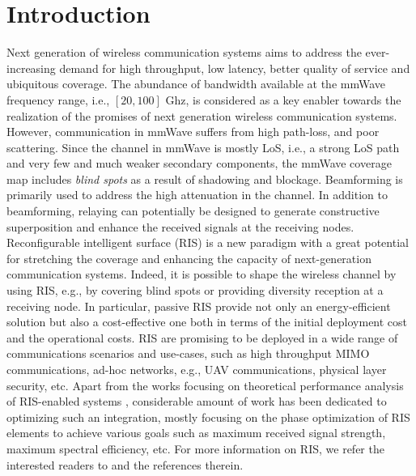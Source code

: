 \section{Introduction}


Next generation of wireless communication systems aims to address the ever-increasing demand for high throughput, low latency, better quality of service and ubiquitous coverage. The abundance of bandwidth available at the mmWave frequency range, i.e., $[20, 100]$ Ghz, is considered as a key enabler towards the realization of the promises of next generation wireless communication systems. However, communication in mmWave suffers from high path-loss, and poor scattering. Since the channel in mmWave is mostly LoS, i.e., a strong LoS path and very few and much weaker secondary components, the mmWave coverage map includes \emph{blind spots} as a result of shadowing and blockage. Beamforming is primarily used to address the high attenuation in the channel. In addition to beamforming, relaying can potentially be designed to generate constructive superposition and enhance the received signals at the receiving nodes. 
Reconfigurable intelligent surface (RIS)\cite{Huang19}\cite{Liaskos18}\cite{Basar19} is a new paradigm with a great potential for stretching the coverage and enhancing the capacity of next-generation communication systems. Indeed, it is possible to shape the wireless channel by using RIS, e.g., by covering blind spots or providing diversity reception at a receiving node. In particular, passive RIS provide not only an energy-efficient solution but also a cost-effective one both in terms of the initial deployment cost and the operational costs. RIS are promising to be deployed in a wide range of communications scenarios and use-cases, such as high throughput MIMO communications\cite{Huang20}\cite{Nadeem20}, ad-hoc networks, e.g., UAV communications\cite{Li20}, physical layer security\cite{Maka20}, etc. %
Apart from the works focusing on theoretical performance analysis of RIS-enabled systems  \cite{Han19}\cite{Nadeem20}\cite{Jung19}, considerable amount of work has been dedicated to optimizing such an integration, mostly focusing on the phase optimization of RIS elements \cite{Abey20}\cite{Guo20}\cite{Di20}\cite{Ata20} to achieve various goals such as maximum received signal strength, maximum spectral efficiency,  etc. For more information on RIS, we refer the interested readers to \cite{Liu21} and the references therein.



